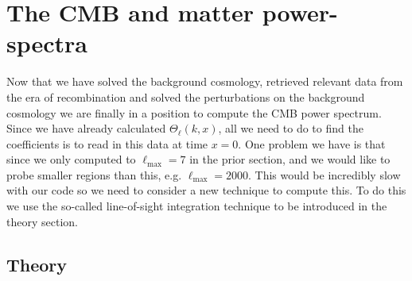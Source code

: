 \documentclass[%
reprint,
 amsmath,amssymb,
 aps,
]{revtex4-2}
\begin{document}
\section{The CMB and matter power-spectra}
\label{sec:4}
Now that we have solved the background cosmology, retrieved relevant data from the era of recombination and solved the perturbations on the background cosmology we are finally in a position to compute the CMB power spectrum. Since we have already calculated $\Theta_\ell(k,x)$, all we need to do to find the coefficients is to read in this data at time $x=0$. One problem we have is that since we only computed to $\ell_\text{max}=7$ in the prior section, and we would like to probe smaller regions than this, e.g. $\ell_{\text{max}}=2000$. This would be incredibly slow with our code so we need to consider a new technique to compute this. To do this we use the so-called line-of-sight integration technique to be introduced in the theory section.

\subsection{Theory}
\end{document}
